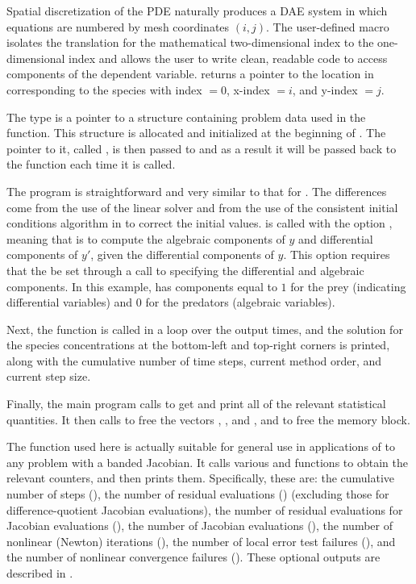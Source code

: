Spatial discretization of the PDE naturally produces a DAE system in
which equations are numbered by mesh coordinates $(i,j)$. The
user-defined macro  isolates the translation for the
mathematical two-dimensional index to the one-dimensional
 index and allows the user to write clean, readable code
to access components of the dependent variable. 
returns a pointer to the location in  corresponding to the species
with index  $= 0$, x-index  $= i$, and y-index  $= j$.

The type  is a pointer to a structure containing problem
data used in the  function.  This structure is
allocated and initialized at the beginning of . The pointer
to it, called , is then passed to  and as a result 
it will be passed back to the  function each time it is called.

The  program is straightforward and very similar to that for .
The differences come from the use of the {\idaband} linear solver and from the
use of the consistent initial conditions algorithm in {\ida} to correct the initial
values.  is called with the option , meaning
that {\ida} is to compute the algebraic components of $y$ and differential  
components of $y'$, given the differential components of $y$.  
This option requires that the   be set through a call to 
 specifying the differential and algebraic components. In this example,
 has components equal to $1$ for the prey (indicating differential 
variables) and $0$ for the predators (algebraic variables).

Next, the  function is called in a loop over the output times,
and the solution for the species concentrations at the bottom-left and
top-right corners is printed, along with the cumulative number of time
steps, current method order, and current step size.

Finally, the main program calls  to get and print
all of the relevant statistical quantities.  It then calls 
to free the vectors , , and , and  to free the 
{\ida} memory block.

The function  used here is actually suitable for
general use in applications of {\ida} to any problem with a banded
Jacobian.  It calls various  and 
functions to obtain the relevant counters, and then prints them.
Specifically, these are: the cumulative number of steps (), 
the number of residual evaluations () (excluding those for
difference-quotient Jacobian evaluations),
the number of residual evaluations for Jacobian evaluations (),
the number of Jacobian evaluations (),
the number of nonlinear (Newton) iterations (),
the number of local error test failures (),
and the number of nonlinear convergence failures ().
These optional outputs are described in .

